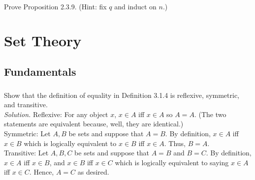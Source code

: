 \documentclass{amsart}
\theoremstyle{definition}
\newcommand{\soln}{\newline\textit{Solution.} }
\begin{document}
\subsubsection{} Prove Proposition 2.3.9. (Hint: fix $q$ and induct on $n$.)

\newpage

\section{Set Theory}

\subsection{Fundamentals} 

\subsubsection{} Show that the definition of equality in Definition 3.1.4 is reflexive, symmetric, and transitive. \\
\soln Reflexive: For any object $x$, $x\in A$ iff $x\in A$ so $A=A$. (The two statements are equivalent because, well, they are identical.) \\
Symmetric: Let $A,B$ be sets and suppose that $A=B$. By definition, $x\in A$ iff $x\in B$ which is logically equivalent to $x\in B$ iff $x\in A$. Thus, $B=A$. \\
Transitive: Let $A,B,C$ be sets and suppose that $A=B$ and $B=C$. By definition, $x\in A$ iff $x\in B$, and $x\in B$ iff $x\in C$ which is logically equivalent to saying $x\in A$ iff $x\in C$. Hence, $A=C$ as desired. \\
\end{document}
